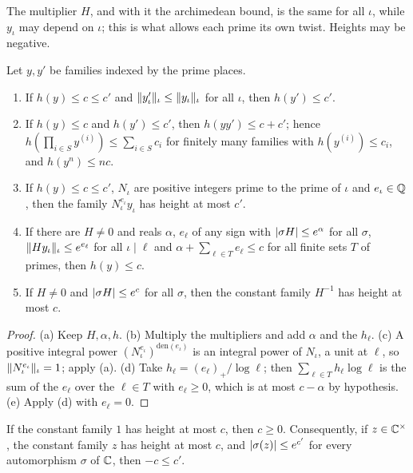 The multiplier $H$, and with it the archimedean bound, is the same for all $\iota$, while $y_\iota$
may depend on $\iota$; this is what allows each prime its own twist. Heights may be negative.

\begin{lemma}\label{lem:height-calculus}
Let $y,y'$ be families indexed by the prime places.
\begin{enumerate}[label=\textup{(\alph*)}]
\item If $h(y)\le c\le c'$ and $\lVert y'_\iota\rVert_\iota\le\lVert y_\iota\rVert_\iota$ for all $\iota$, then
$h(y')\le c'$.
\item If $h(y)\le c$ and $h(y')\le c'$, then $h(yy')\le c+c'$; hence $h(\prod_{i\in S}y^{(i)})\le
\sum_{i\in S}c_i$ for finitely many families with $h(y^{(i)})\le c_i$, and $h(y^n)\le nc$.
\item If $h(y)\le c\le c'$, $N_\iota$ are positive integers prime to the prime of $\iota$ and
$e_\iota\in\mathbb{Q}$, then the family $N_\iota^{e_\iota}y_\iota$ has height at most $c'$.
\item If there are $H\neq0$ and reals $\alpha$, $e_\ell$ of any sign with $\lvert \sigma H\rvert\le e^\alpha$
for all $\sigma$, $\lVert Hy_\iota\rVert_\iota\le e^{e_\ell}$ for all $\iota\mid\ell$ and
$\alpha+\sum_{\ell\in T}e_\ell\le c$ for all finite sets $T$ of primes, then $h(y)\le c$.
\item If $H\neq0$ and $\lvert \sigma H\rvert\le e^c$ for all $\sigma$, then the constant family $H^{-1}$
has height at most $c$.
\end{enumerate}
\end{lemma}

\begin{proof}
(a) Keep $H,\alpha,h$. (b) Multiply the multipliers and add $\alpha$ and the $h_\ell$. (c) A
positive integral power $(N_\iota^{e_\iota})^{\mathrm{den}(e_\iota)}$ is an integral power of
$N_\iota$, a unit at $\ell$, so $\lVert N_\iota^{e_\iota}\rVert_\iota=1$; apply (a). (d) Take
$h_\ell=(e_\ell)_+/\log\ell$; then $\sum_{\ell\in T}h_\ell\log\ell$ is the sum of the $e_\ell$
over the $\ell\in T$ with $e_\ell\ge0$, which is at most $c-\alpha$ by hypothesis. (e) Apply (d)
with $e_\ell=0$.
\end{proof}

\begin{proposition}\label{prop:height-nonneg}
If the constant family $1$ has height at most $c$, then $c\ge0$. Consequently, if $z\in\mathbb{C}^\times$,
the constant family $z$ has height at most $c$, and $\lvert \sigma(z)\rvert\le e^{c'}$ for every
automorphism $\sigma$ of $\mathbb{C}$, then $-c\le c'$.
\end{proposition}


